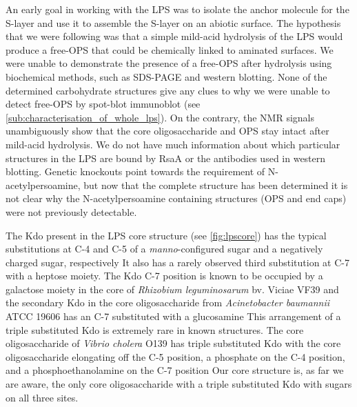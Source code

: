 An early goal in working with the \caulobacter \ac{LPS} was to isolate the anchor molecule for the \ac{S-layer} and use it to assemble the \ac{S-layer} on an abiotic surface. The hypothesis that we were following was that a simple mild-acid hydrolysis of the \ac{LPS} would produce a free-\ac{OPS} that could be chemically linked to aminated surfaces. We were unable to demonstrate the presence of a free-\ac{OPS} after hydrolysis using biochemical methods, such as \ac{SDS-PAGE} and western blotting. None of the determined carbohydrate structures give any clues to why we were unable to detect free-\ac{OPS} by spot-blot immunoblot (see \cref{sub:characterisation_of_whole_lps}). On the contrary, the \ac{NMR} signals unambiguously show that the core oligosaccharide and \ac{OPS} stay intact after mild-acid hydrolysis. We do not have much information about which particular structures in the \caulobacter \ac{LPS} are bound by RsaA or the antibodies used in western blotting. Genetic knockouts point towards the requirement of N-acetylpersoamine, but now that the complete structure has been determined it is not clear why the N-acetylpersoamine containing structures (\ac{OPS} and end caps) were not previously detectable.

The Kdo present in the \ac{LPS} core structure (see \cref{fig:lpscore}) has the typical
substitutions at C-4 and C-5 of a \textit{manno}-configured sugar and a negatively charged sugar,
respectively It also has a rarely observed third substitution at C-7 with a
heptose moiety. The Kdo C-7 position is known to be occupied by a galactose moiety in the core of
\textit{Rhizobium leguminosarum} bv. Viciae VF39 and the secondary Kdo in
the core oligosaccharide from \textit{Acinetobacter baumannii} ATCC 19606 has an C-7 substituted
with a glucosamine This arrangement of a triple
substituted Kdo is extremely rare in known structures. The core oligosaccharide
of \textit{Vibrio cholera} O139 has triple substituted Kdo with the core
oligosaccharide elongating off the C-5 position, a phosphate on the C-4
position, and a phosphoethanolamine on the C-7
position Our core structure is, as far we are aware,
the only core oligosaccharide with a triple substituted Kdo with sugars on all
three sites.

